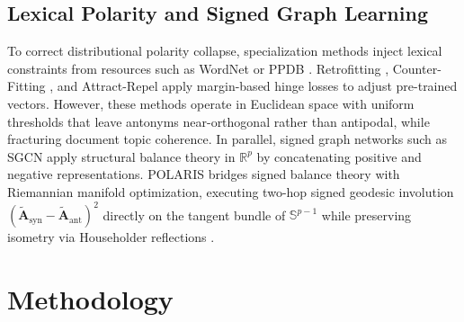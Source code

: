 \documentclass[journal]{IEEEtran}
\begin{document}
\subsection{Lexical Polarity and Signed Graph Learning}
To correct distributional polarity collapse, specialization methods inject lexical constraints from resources such as WordNet \cite{miller1995wordnet} or PPDB \cite{pavlick2015ppdb}. Retrofitting \cite{faruqui2015retrofitting}, Counter-Fitting \cite{mrksic2016counter}, and Attract-Repel \cite{mrksic2017semantic} apply margin-based hinge losses to adjust pre-trained vectors. However, these methods operate in Euclidean space with uniform thresholds that leave antonyms near-orthogonal rather than antipodal, while fracturing document topic coherence. In parallel, signed graph networks such as SGCN \cite{derr2018signed} apply structural balance theory \cite{cartwright1956structural} in $\mathbb{R}^p$ by concatenating positive and negative representations. POLARIS bridges signed balance theory with Riemannian manifold optimization, executing two-hop signed geodesic involution $(\tilde{\mathbf{A}}_{\text{syn}} - \tilde{\mathbf{A}}_{\text{ant}})^2$ directly on the tangent bundle of $\mathbb{S}^{p-1}$ while preserving isometry via Householder reflections \cite{tomczak2016improving,mhammedi2017efficient}.

\section{Methodology}
\end{document}
